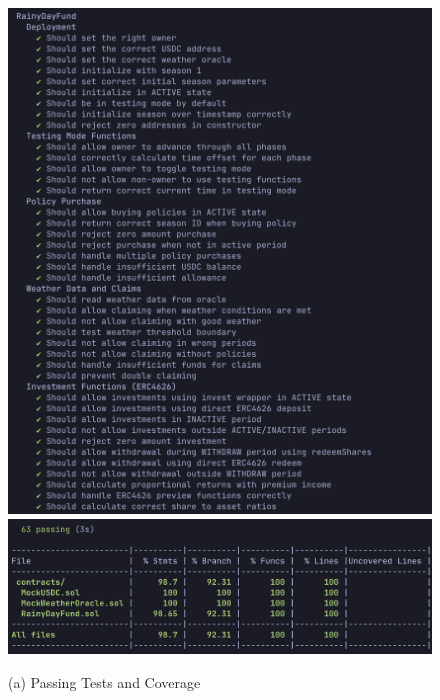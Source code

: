 \documentclass[11pt,a4paper]{article}
\begin{document}
    \begin{figure}[H]
        \centering
        \begin{minipage}[b]{0.48\textwidth}
            \centering
            \includegraphics[width=0.95\linewidth]{graphics/Passing_Tests}
            \includegraphics[width=0.95\linewidth]{graphics/Test_Coverage}
            \caption*{(a) Passing Tests and Coverage}
        \end{minipage}\hfill
        \begin{minipage}[b]{0.48\textwidth}
            \centering

\end{minipage}
\end{figure}
\end{document}
